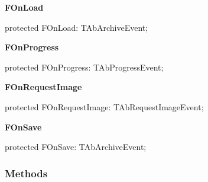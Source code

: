 \documentclass{report}
\newif\ifpdf
\begin{document}
\begin{list}{}
\begin{flushleft}
\ifpdf
\end{flushleft}
\fi


\par  \label{AbArcTyp.TAbArchive-FOnLoad}
\item[\textbf{FOnLoad}\hfill]
\ifpdf
\begin{flushleft}
\fi
\begin{ttfamily}
protected FOnLoad: TAbArchiveEvent;\end{ttfamily}

\ifpdf
\end{flushleft}
\fi


\par  \label{AbArcTyp.TAbArchive-FOnProgress}
\item[\textbf{FOnProgress}\hfill]
\ifpdf
\begin{flushleft}
\fi
\begin{ttfamily}
protected FOnProgress: TAbProgressEvent;\end{ttfamily}

\ifpdf
\end{flushleft}
\fi


\par  \label{AbArcTyp.TAbArchive-FOnRequestImage}
\item[\textbf{FOnRequestImage}\hfill]
\ifpdf
\begin{flushleft}
\fi
\begin{ttfamily}
protected FOnRequestImage: TAbRequestImageEvent;\end{ttfamily}

\ifpdf
\end{flushleft}
\fi


\par  \label{AbArcTyp.TAbArchive-FOnSave}
\item[\textbf{FOnSave}\hfill]
\ifpdf
\begin{flushleft}
\fi
\begin{ttfamily}
protected FOnSave: TAbArchiveEvent;\end{ttfamily}

\ifpdf
\end{flushleft}
\fi


\par  \end{list}
\subsubsection*{\large{\textbf{Methods}}\normalsize\hspace{1ex}\hfill}
\end{document}
